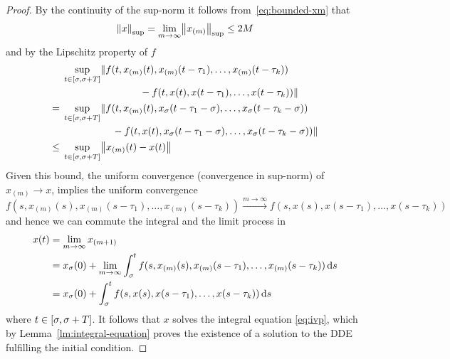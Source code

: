 \begin{proof}
        By the continuity of the sup-norm it follows from~\eqref{eq:bounded-xm} that
        \begin{equation*}
            \supnorm*{x}=\lim_{m\to\infty}\supnorm*{x_{(m)}}\leq 2M
        \end{equation*}
        and by the Lipschitz property of $f$
        \begin{align*}
            &\!\begin{multlined}[t][0.8\displaywidth]
                \sup_{t\in\compactum{\tzero}{\tzero+T}}\lVert f(t,x_{(m)}(t),x_{(m)}(t-\tau_1),\ldots,x_{(m)}(t-\tau_k))\\
                -f(t,x(t),x(t-\tau_1),\ldots,x(t-\tau_k))\rVert
            \end{multlined}\\
            ={} &\!\begin{multlined}[t][0.8\displaywidth]
                \sup_{t\in\compactum{\tzero}{\tzero+T}}\lVert f(t,x_{(m)}(t),x_{\tzero}(t-\tau_1-\tzero),\ldots,x_{\tzero}(t-\tau_k-\tzero))\\
                -f(t,x(t),x_{\tzero}(t-\tau_1-\tzero),\ldots,x_{\tzero}(t-\tau_k-\tzero))\rVert
            \end{multlined}\\
            \leq{} &\sup_{t\in\compactum{\tzero}{\tzero+T}}\nnorm*{x_{(m)}(t)-x(t)}
        \end{align*}
        Given this bound, the uniform convergence (convergence in sup-norm) of $x_{(m)}\to x$, implies the uniform convergence
        \begin{equation*}
            f(s,x_{(m)}(s),x_{(m)}(s-\tau_1),\ldots,x_{(m)}(s-\tau_k)) \xrightarrow{m\to\infty} f(s,x(s),x(s-\tau_1),\ldots,x(s-\tau_k))
        \end{equation*}
        and hence we can commute the integral and the limit process in
        \begin{align*}
            x(t) &= \lim_{m\to\infty} x_{(m+1)}\\
            &= x_\tzero(0) + \lim_{m\to\infty}\integral{\tzero}{t} f(s,x_{(m)}(s),x_{(m)}(s-\tau_1),\ldots,x_{(m)}(s-\tau_k))\dx[s]\\
            &= x_\tzero(0) + \integral{\tzero}{t} f(s,x(s),x(s-\tau_1),\ldots,x(s-\tau_k))\dx[s]
        \end{align*}
        where $t\in\compactum{\tzero}{\tzero+T}$.
        It follows that $x$ solves the integral equation \eqref{eq:ivp}, which by Lemma~\ref{lm:integral-equation} proves the existence of a solution to the DDE fulfilling the initial condition.


\end{proof}
